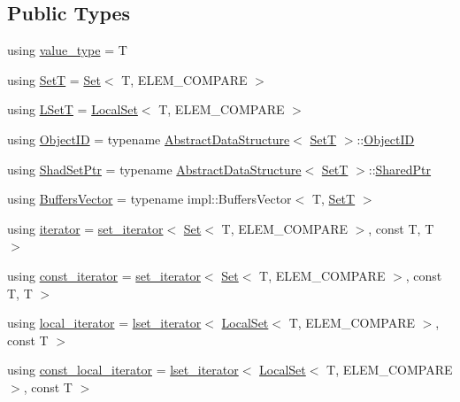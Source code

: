 \subsection*{Public Types}
\begin{DoxyCompactItemize}
\item 
using \hyperlink{classshad_1_1Set_a20c26f02edb7c6c978a0e0b6f2b46c80}{value\-\_\-type} = T
\item 
using \hyperlink{classshad_1_1Set_ac4975698d3f73a58bb223e28ca582fa9}{Set\-T} = \hyperlink{classshad_1_1Set}{Set}$<$ T, E\-L\-E\-M\-\_\-\-C\-O\-M\-P\-A\-R\-E $>$
\item 
using \hyperlink{classshad_1_1Set_a93ad50cc28bbc3b48f87e69bfbf3c632}{L\-Set\-T} = \hyperlink{classshad_1_1LocalSet}{Local\-Set}$<$ T, E\-L\-E\-M\-\_\-\-C\-O\-M\-P\-A\-R\-E $>$
\item 
using \hyperlink{classshad_1_1Set_a05ba25e24c892602d707b21e3e4300b9}{Object\-I\-D} = typename \hyperlink{classshad_1_1AbstractDataStructure}{Abstract\-Data\-Structure}$<$ \hyperlink{classshad_1_1Set_ac4975698d3f73a58bb223e28ca582fa9}{Set\-T} $>$\-::\hyperlink{classshad_1_1Set_a05ba25e24c892602d707b21e3e4300b9}{Object\-I\-D}
\item 
using \hyperlink{classshad_1_1Set_aa35015620563a346ef29432143fe1f44}{Shad\-Set\-Ptr} = typename \hyperlink{classshad_1_1AbstractDataStructure}{Abstract\-Data\-Structure}$<$ \hyperlink{classshad_1_1Set_ac4975698d3f73a58bb223e28ca582fa9}{Set\-T} $>$\-::\hyperlink{classshad_1_1AbstractDataStructure_a8bb29450966955c546d40421ce46316f}{Shared\-Ptr}
\item 
using \hyperlink{classshad_1_1Set_ace82796db9a7938647d935452ea6d39c}{Buffers\-Vector} = typename impl\-::\-Buffers\-Vector$<$ T, \hyperlink{classshad_1_1Set_ac4975698d3f73a58bb223e28ca582fa9}{Set\-T} $>$
\item 
using \hyperlink{classshad_1_1Set_a01298773ecde90c0df1e444429bf9703}{iterator} = \hyperlink{classshad_1_1set__iterator}{set\-\_\-iterator}$<$ \hyperlink{classshad_1_1Set}{Set}$<$ T, E\-L\-E\-M\-\_\-\-C\-O\-M\-P\-A\-R\-E $>$, const T, T $>$
\item 
using \hyperlink{classshad_1_1Set_a0b2608f92f5397a25e62fad925fc177e}{const\-\_\-iterator} = \hyperlink{classshad_1_1set__iterator}{set\-\_\-iterator}$<$ \hyperlink{classshad_1_1Set}{Set}$<$ T, E\-L\-E\-M\-\_\-\-C\-O\-M\-P\-A\-R\-E $>$, const T, T $>$
\item 
using \hyperlink{classshad_1_1Set_a531920d32511b8fa5ffef94b0d772e29}{local\-\_\-iterator} = \hyperlink{classshad_1_1lset__iterator}{lset\-\_\-iterator}$<$ \hyperlink{classshad_1_1LocalSet}{Local\-Set}$<$ T, E\-L\-E\-M\-\_\-\-C\-O\-M\-P\-A\-R\-E $>$, const T $>$
\item 
using \hyperlink{classshad_1_1Set_a0857d9ce7a249e860e3a67bc18f7de8b}{const\-\_\-local\-\_\-iterator} = \hyperlink{classshad_1_1lset__iterator}{lset\-\_\-iterator}$<$ \hyperlink{classshad_1_1LocalSet}{Local\-Set}$<$ T, E\-L\-E\-M\-\_\-\-C\-O\-M\-P\-A\-R\-E $>$, const T $>$
\end{DoxyCompactItemize}

